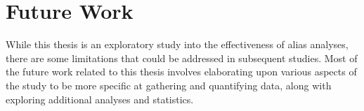 \chapter{Future Work}

While this thesis is an exploratory study into the effectiveness of alias analyses, there are some limitations that could be addressed in subsequent studies. Most of the future work related to this thesis involves elaborating upon various aspects of the study to be more specific at gathering and quantifying data, along with exploring additional analyses and statistics.
